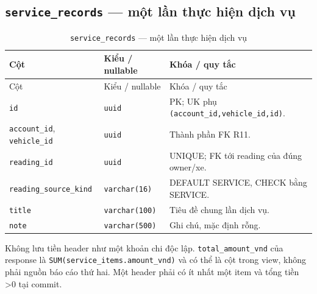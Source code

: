 \subsection{\texttt{service\_\allowbreak{}records} — một lần thực hiện dịch vụ}
\begin{smalltable}\begin{longtable}{L{3.0cm}L{3.2cm}L{8.2cm}}
\caption{\texttt{service\_\allowbreak{}records} — một lần thực hiện dịch vụ}\label{tab:dictionary-9}\\\toprule
Cột & Kiểu / nullable & Khóa / quy tắc\\\midrule\endfirsthead
\toprule Cột & Kiểu / nullable & Khóa / quy tắc\\\midrule\endhead
\texttt{id} & \texttt{uuid} & PK; UK phụ \texttt{(account\_\allowbreak{}id,\allowbreak{}vehicle\_\allowbreak{}id,\allowbreak{}id)}.\\
\texttt{account\_\allowbreak{}id}, \texttt{vehicle\_\allowbreak{}id} & \texttt{uuid} & Thành phần FK R11.\\
\texttt{reading\_\allowbreak{}id} & \texttt{uuid} & UNIQUE; FK tới reading của đúng owner/xe.\\
\texttt{reading\_\allowbreak{}source\_\allowbreak{}kind} & \texttt{varchar(16)} & DEFAULT SERVICE, CHECK bằng SERVICE.\\
\texttt{title} & \texttt{varchar(100)} & Tiêu đề chung lần dịch vụ.\\
\texttt{note} & \texttt{varchar(500)} & Ghi chú, mặc định rỗng.\\
\bottomrule\end{longtable}\end{smalltable}
Không lưu tiền header như một khoản chi độc lập. \texttt{total\_\allowbreak{}amount\_\allowbreak{}vnd} của response là \texttt{SUM(service\_\allowbreak{}items.amount\_\allowbreak{}vnd)} và có thể là cột trong view, không phải nguồn báo cáo thứ hai. Một header phải có ít nhất một item và tổng tiền >0 tại commit.\par
